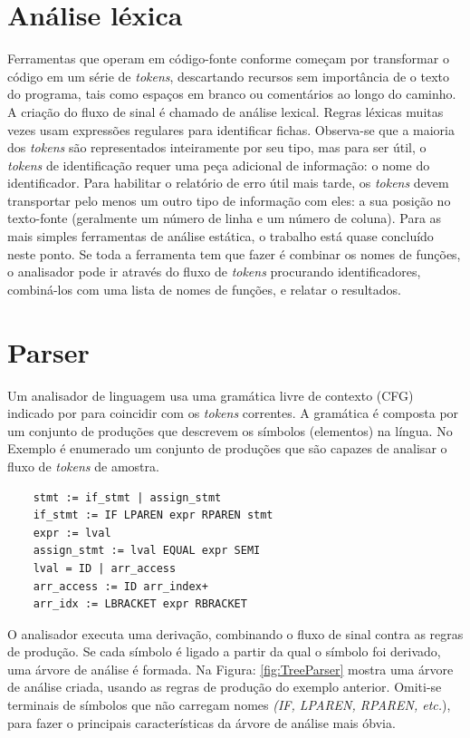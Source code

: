 	\section {Análise léxica}
	Ferramentas que operam em código-fonte conforme \cite{Wichmann95industrialperspective} começam por transformar o código em um série de {\it tokens}, descartando recursos sem importância de o texto do programa, tais como espaços em branco ou comentários ao longo do caminho. A criação do fluxo de sinal é chamado de análise lexical. Regras léxicas muitas vezes usam expressões regulares para identificar fichas.
	Observa-se que a maioria dos {\it tokens} são representados inteiramente por seu tipo, mas para ser útil, o {\it tokens} de identificação requer uma peça adicional de informação: o nome do identificador. Para habilitar o relatório de erro útil mais tarde, os {\it tokens} devem transportar pelo menos um outro tipo de informação com eles: a sua posição no texto-fonte (geralmente um número de linha e um número de coluna). Para as mais simples ferramentas de análise estática, o trabalho está quase concluído neste ponto. Se toda a ferramenta tem que fazer é combinar os nomes de funções, o analisador pode ir através do fluxo de {\it tokens} procurando identificadores, combiná-los com uma lista de nomes de funções, e relatar o resultados.
	
	\section{Parser}
	Um analisador de linguagem usa uma gramática livre de contexto (CFG) indicado por \cite{Chess:2007:SPS:1406221} para coincidir com os {\it tokens} correntes. A gramática é composta por um conjunto de produções que descrevem os símbolos (elementos) na língua. No Exemplo é enumerado um conjunto de produções que são capazes de analisar o fluxo de {\it tokens} de amostra.
	
	\begin{lstlisting}
	stmt := if_stmt | assign_stmt
	if_stmt := IF LPAREN expr RPAREN stmt
	expr := lval
	assign_stmt := lval EQUAL expr SEMI
	lval = ID | arr_access
	arr_access := ID arr_index+
	arr_idx := LBRACKET expr RBRACKET
	\end{lstlisting}
	
	O analisador executa uma derivação, combinando o fluxo de sinal contra as regras de produção. Se cada símbolo é ligado a partir da qual o símbolo foi derivado, uma árvore de análise é formada. Na Figura: \ref{fig:TreeParser} mostra uma árvore de análise criada, usando as regras de produção do exemplo anterior. Omiti-se terminais de símbolos que não carregam nomes \textit{(IF, LPAREN, RPAREN, etc.}), para fazer o principais características da árvore de análise mais óbvia.
	
